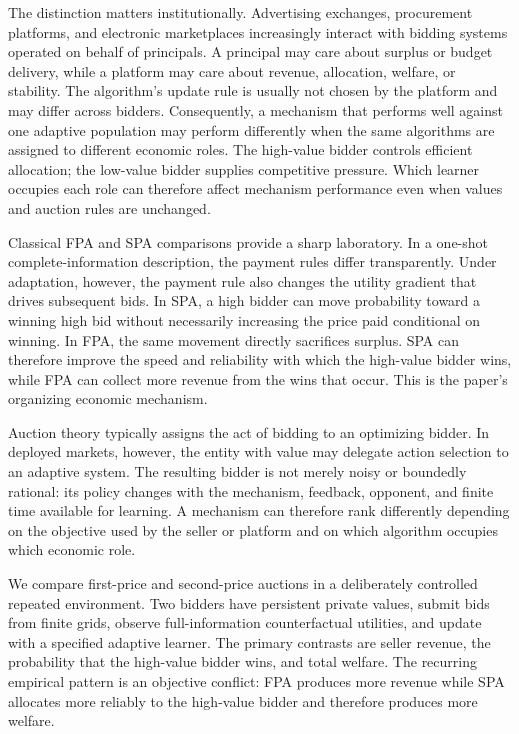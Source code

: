 \documentclass[11pt]{article}
\begin{document}
The distinction matters institutionally. Advertising exchanges, procurement platforms, and electronic marketplaces increasingly interact with bidding systems operated on behalf of principals. A principal may care about surplus or budget delivery, while a platform may care about revenue, allocation, welfare, or stability. The algorithm's update rule is usually not chosen by the platform and may differ across bidders. Consequently, a mechanism that performs well against one adaptive population may perform differently when the same algorithms are assigned to different economic roles. The high-value bidder controls efficient allocation; the low-value bidder supplies competitive pressure. Which learner occupies each role can therefore affect mechanism performance even when values and auction rules are unchanged.

Classical FPA and SPA comparisons provide a sharp laboratory. In a one-shot complete-information description, the payment rules differ transparently. Under adaptation, however, the payment rule also changes the utility gradient that drives subsequent bids. In SPA, a high bidder can move probability toward a winning high bid without necessarily increasing the price paid conditional on winning. In FPA, the same movement directly sacrifices surplus. SPA can therefore improve the speed and reliability with which the high-value bidder wins, while FPA can collect more revenue from the wins that occur. This is the paper's organizing economic mechanism.

Auction theory typically assigns the act of bidding to an optimizing bidder. In deployed markets, however, the entity with value may delegate action selection to an adaptive system. The resulting bidder is not merely noisy or boundedly rational: its policy changes with the mechanism, feedback, opponent, and finite time available for learning. A mechanism can therefore rank differently depending on the objective used by the seller or platform and on which algorithm occupies which economic role.

We compare first-price and second-price auctions in a deliberately controlled repeated environment. Two bidders have persistent private values, submit bids from finite grids, observe full-information counterfactual utilities, and update with a specified adaptive learner. The primary contrasts are seller revenue, the probability that the high-value bidder wins, and total welfare. The recurring empirical pattern is an objective conflict: FPA produces more revenue while SPA allocates more reliably to the high-value bidder and therefore produces more welfare.
\end{document}
